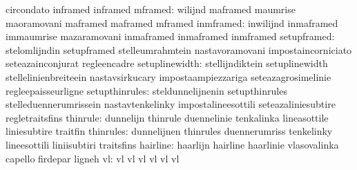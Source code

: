                                   circondato                       inframed
                                  inframed
                         mframed: wilijnd                          maframed
                                  maumrise                         maoramovani
                                  maframed                         maframed
                                  mframed
                       inmframed: inwilijnd                        inmaframed
                                  immaumrise                       mazaramovani
                                  inmaframed                       inmaframed
                                  inmframed
                     setupframed: stelomlijndin                    setupframed
                                  stelleumrahmtein                 nastavoramovani
                                  impostaincorniciato              seteazainconjurat
                                  regleencadre
                  setuplinewidth: stellijndiktein                  setuplinewidth
                                  stellelinienbreiteein            nastavsirkucary
                                  impostaampiezzariga              seteazagrosimelinie
                                  regleepaisseurligne
                  setupthinrules: steldunnelijnenin                setupthinrules
                                  stelleduennerumrissein           nastavtenkelinky
                                  impostalineesottili              seteazaliniesubtire
                                  regletraitsfins
                        thinrule: dunnelijn                        thinrule
                                  duennelinie                      tenkalinka
                                  lineasottile                     liniesubtire
                                  traitfin
                       thinrules: dunnelijnen                      thinrules
                                  duennerumriss                    tenkelinky
                                  lineesottili                     liniisubtiri
                                  traitsfins
                        hairline: haarlijn                         hairline
                                  haarlinie                        vlasovalinka
                                  capello                          firdepar
                                  ligneh
                              vl: vl                               vl
                                  vl                               vl
                                  vl                               vl
